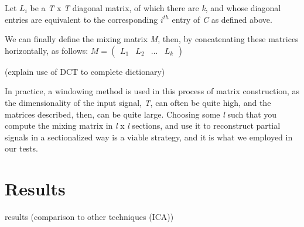 \documentclass{article}
\begin{document}
Let \textit{$L_{i}$} be a \textit{T} x \textit{T} diagonal matrix, of which there are \textit{k}, and whose diagonal entries are equivalent to the corresponding \textit{$i^{th}$} entry of \textit{C} as defined above.
 
We can finally define the mixing matrix \textit{M}, then, by concatenating these matrices horizontally, as follows: $M = \left( \begin{smallmatrix} L_{1}&L_{2}&...&L_{\textit{k}}  \end{smallmatrix} \right)$

(explain use of DCT to complete dictionary)

In practice, a windowing method is used in this process of matrix construction, as the dimensionality of the input signal, \textit{T}, can often be quite high, and the matrices described, then, can be quite large. Choosing some \textit{l} such that you compute the mixing matrix in \textit{l} x \textit{l} sections, and use it to reconstruct partial signals in a sectionalized way is a viable strategy, and it is what we employed in our tests.



\section{Results}
results (comparison to other techniques (ICA))
\end{document}
